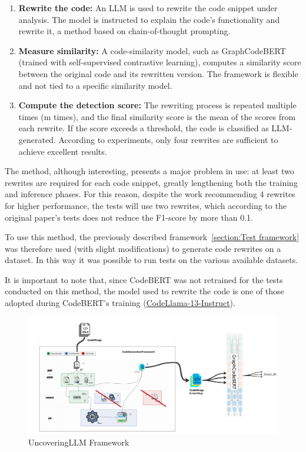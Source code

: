 \begin{enumerate}
\item \textbf{Rewrite the code:} An LLM is used to rewrite the code snippet under analysis. 
The model is instructed to explain the code’s functionality and rewrite it, a 
method based on chain-of-thought prompting.

\item \textbf{Measure similarity:} A code-similarity model, such as 
GraphCodeBERT\cite{guo2020graphcodebert} 
(trained with self-supervised contrastive learning), computes a similarity 
score between the original code and its rewritten version. The framework is 
flexible and not tied to a specific similarity model.

\item \textbf{Compute the detection score:} The rewriting process is repeated multiple times 
(m times), and the final similarity score is the mean of the scores from each 
rewrite. If the score exceeds a threshold, the code is classified as LLM-generated. 
According to experiments, only four rewrites are sufficient to achieve excellent results.
\end{enumerate}

The method, although interesting, presents a major problem in use: 
at least two rewrites are required for each code snippet, greatly 
lengthening both the training and inference phases. For this reason, 
despite the work recommending 4 rewrites for higher performance, the tests 
will use two rewrites, which according to the original paper’s tests does not 
reduce the F1-score by more than 0.1.

To use this method, the previously described framework~\ref{section:Test framework} 
was therefore used (with slight modifications) to generate code rewrites on a 
dataset. In this way it was possible to run tests on the various available datasets.

It is important to note that, since CodeBERT was not retrained for the tests 
conducted on this method, the model used to rewrite the code is one of those 
adopted during CodeBERT’s training 
(\href{https://huggingface.co/codellama/CodeLlama-13b-Instruct-hf}{CodeLlama-13-Instruct}\cite{roziere2023code}).

\begin{figure}[H]
    \centering
    \includegraphics[width=1\textwidth]{img/UncoveringLLM/framework.jpg}
    \caption{UncoveringLLM Framework}
    \label{fig:UncoveringLLM Framework}
\end{figure}




